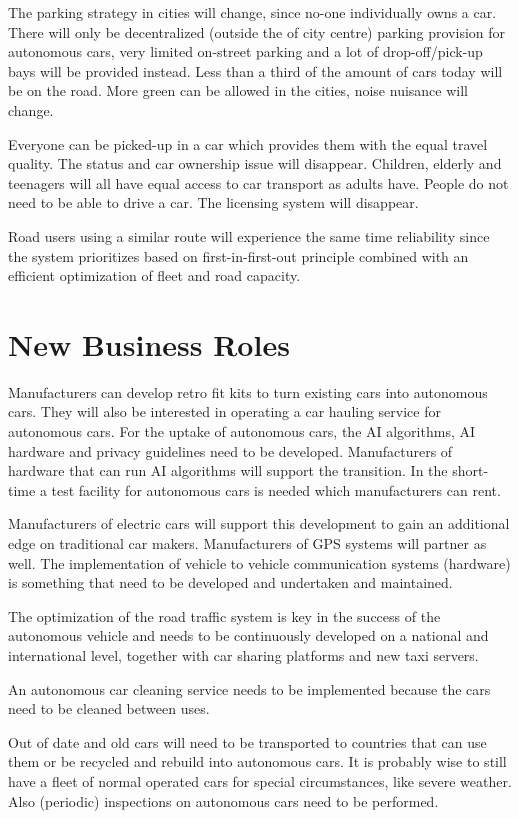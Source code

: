 \documentclass[a4paper]{article}
\begin{document}
The parking strategy in cities will change, since no-one individually owns a car. There will only be decentralized (outside the of city centre) parking provision for autonomous cars, very limited on-street parking and a lot of drop-off/pick-up bays will be provided instead. Less than a third of the amount of cars today will be on the road. More green can be allowed in the cities, noise nuisance will change.

Everyone can be picked-up in a car which provides them with the equal travel quality. The status and car ownership issue will disappear. Children, elderly and teenagers will all have equal access to car transport as adults have. People do not need to be able to drive a car. The licensing system will disappear.

Road users using a similar route will experience the same time reliability since the system prioritizes based on first-in-first-out principle combined with an efficient optimization of fleet and road capacity.

\section{New Business Roles}
\label{sec:new-business-roles}

Manufacturers can develop retro fit kits to turn existing cars into autonomous cars. They will also be interested in operating a car hauling service for autonomous cars. For the uptake of autonomous cars, the AI algorithms, AI hardware and privacy guidelines need to be developed. Manufacturers of hardware that can run AI algorithms will support the transition. In the short-time a test facility for autonomous cars is needed which manufacturers can rent.

Manufacturers of electric cars will support this development to gain an additional edge on traditional car makers.
Manufacturers of GPS systems will partner as well. The implementation of vehicle to vehicle communication systems (hardware) is something that need to be developed and undertaken and maintained. 

The optimization of the road traffic system is key in the success of the autonomous vehicle and needs to be continuously developed on a national and international level, together with car sharing platforms and new taxi servers.  

An autonomous car cleaning service needs to be implemented because the cars need to be cleaned between uses.

Out of date and old cars will need to be transported to countries that can use them or be recycled and rebuild into autonomous cars. It is probably wise to still have a fleet of normal operated cars for special circumstances, like severe weather. Also (periodic) inspections on autonomous cars need to be performed. 
\end{document}
